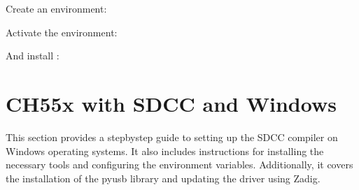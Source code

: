 \documentclass[letterpaper,10pt,english]{sphinxmanual}
\begin{document}
\sphinxAtStartPar
Create an environment:

\begin{sphinxVerbatim}[commandchars=\\\{\}]
   
\end{sphinxVerbatim}

\sphinxAtStartPar
Activate the environment:

\begin{sphinxVerbatim}[commandchars=\\\{\}]
 
\end{sphinxVerbatim}

\sphinxAtStartPar
And install :

\begin{sphinxVerbatim}[commandchars=\\\{\}]
  
\end{sphinxVerbatim}

\sphinxstepscope


\chapter{CH55x with SDCC and Windows}
\label{\detokenize{install_windows:ch55x-with-sdcc-and-windows}}\label{\detokenize{install_windows::doc}}
\sphinxAtStartPar
This section provides a step\sphinxhyphen{}by\sphinxhyphen{}step guide to setting up the SDCC compiler on Windows operating systems. It also includes instructions for installing the necessary tools and configuring the environment variables. Additionally, it covers the installation of the pyusb library and updating the driver using Zadig.
\end{document}

